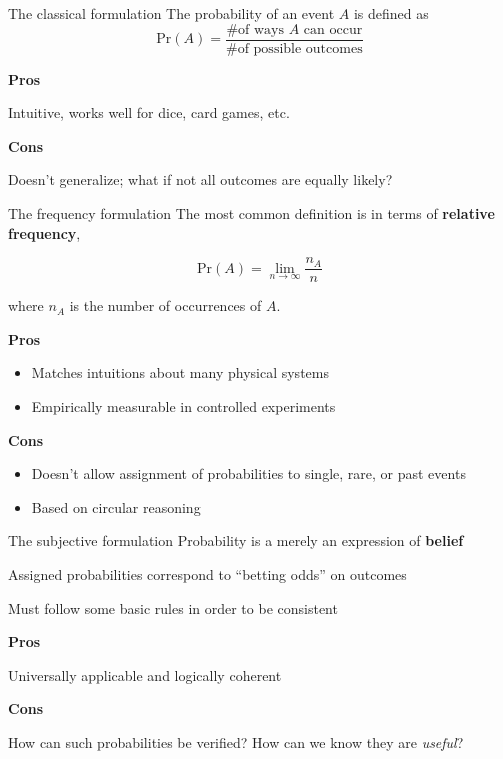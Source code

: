 \documentclass[12pt,aspectratio=169]{beamer}
\newcommand{\prob}{\text{Pr}}
\begin{document}
\begin{frame}{The classical formulation}
    The probability of an event $A$ is defined as
    $$
    \prob(A) = \frac{\text{\# of ways $A$ can occur}}{\text{\# of possible outcomes}}
    $$
    \pause\newline

    \textbf{Pros}
    
    Intuitive, works well for dice, card games, etc.
    \pause\newline

    \textbf{Cons}
    
    Doesn't generalize; what if not all outcomes are equally likely?
\end{frame}

\begin{frame}{The frequency formulation}
     The most common definition is in terms of \textbf{relative frequency},
     \pause
     
     $$
     \prob(A) = \underset{n \rightarrow \infty}{\lim} \frac{n_A}{n}
     $$
     
     where $n_A$ is the number of occurrences of $A$.
     \pause

     \textbf{Pros}
     \begin{itemize}[<+->]
         \item Matches intuitions about many physical systems
         \item Empirically measurable in controlled experiments
     \end{itemize}
     \pause

     \textbf{Cons}
     \begin{itemize}[<+->]
         \item Doesn't allow assignment of probabilities to single, rare, or past events
         \item Based on circular reasoning
     \end{itemize}
     
\end{frame}

\begin{frame}{The subjective formulation}
    Probability is a merely an expression of \textbf{belief}
    \pause\newline

    Assigned probabilities correspond to ``betting odds'' on outcomes
    \pause\newline

    Must follow some basic rules in order to be consistent
    \pause\newline

    \textbf{Pros}

    Universally applicable and logically coherent
    \pause

    \textbf{Cons}

    How can such probabilities be verified? How can we know they are \textit{useful}? 
    
\end{frame}
\end{document}
